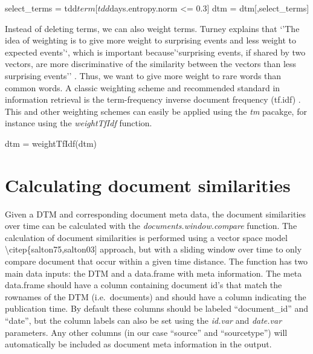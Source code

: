 \begin{Schunk}
\begin{Sinput}
select_terms = tdd$term[tdd$days.entropy.norm <= 0.3]
dtm = dtm[,select_terms]
\end{Sinput}
\end{Schunk}

Instead of deleting terms, we can also weight terms. Turney explains
that `'The idea of weighting is to give more weight to surprising events
and less weight to expected events'`, which is important
because'`surprising events, if shared by two vectors, are more
discriminative of the similarity between the vectors than less
surprising events'' \citep[156]{turney02}. Thus, we want to give more
weight to rare words than common words. A classic weighting scheme and
recommended standard in information retrieval is the term-frequency
inverse document frequency (tf.idf) \citep{sparck72,monroe08}. This and
other weighting schemes can easily be applied using the \emph{tm}
pacakge, for instance using the \emph{weightTfIdf} function.

\begin{Schunk}
\begin{Sinput}
dtm = weightTfIdf(dtm)
\end{Sinput}
\end{Schunk}

\section{Calculating document similarities}

Given a DTM and corresponding document meta data, the document
similarities over time can be calculated with the
\emph{documents.window.compare} function. The calculation of document
similarities is performed using a vector space model
\textbackslash{}citep\{salton75,salton03{]} approach, but with a sliding
window over time to only compare document that occur within a given time
distance. The function has two main data inputs: the DTM and a
data.frame with meta information. The meta data.frame should have a
column containing document id's that match the rownames of the DTM
(i.e.~documents) and should have a column indicating the publication
time. By default these columns should be labeled ``document\_id'' and
``date'', but the column labels can also be set using the \emph{id.var}
and \emph{date.var} parameters. Any other columns (in our case
``source'' and ``sourcetype'') will automatically be included as
document meta information in the output.

